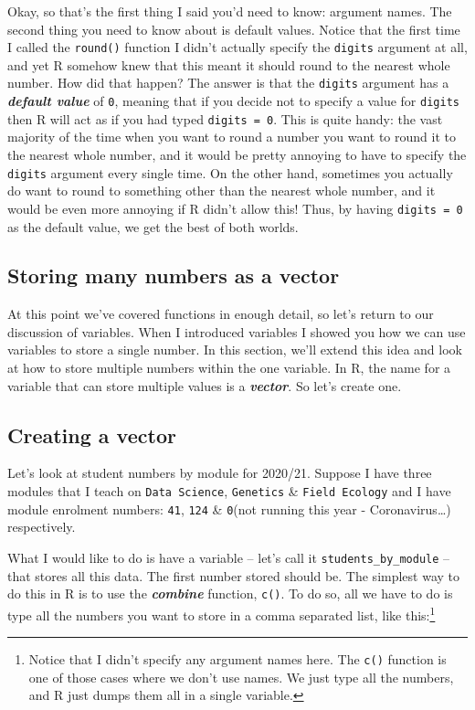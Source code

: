 \documentclass[
]{book}
\begin{document}
Okay, so that's the first thing I said you'd need to know: argument names. The second thing you need to know about is default values. Notice that the first time I called the \texttt{round()} function I didn't actually specify the \texttt{digits} argument at all, and yet R somehow knew that this meant it should round to the nearest whole number. How did that happen? The answer is that the \texttt{digits} argument has a \textbf{\emph{default value}} of \texttt{0}, meaning that if you decide not to specify a value for \texttt{digits} then R will act as if you had typed \texttt{digits\ =\ 0}. This is quite handy: the vast majority of the time when you want to round a number you want to round it to the nearest whole number, and it would be pretty annoying to have to specify the \texttt{digits} argument every single time. On the other hand, sometimes you actually do want to round to something other than the nearest whole number, and it would be even more annoying if R didn't allow this! Thus, by having \texttt{digits\ =\ 0} as the default value, we get the best of both worlds.

\hypertarget{vectors}{%
\subsection{Storing many numbers as a vector}\label{vectors}}

At this point we've covered functions in enough detail, so let's return to our discussion of variables. When I introduced variables I showed you how we can use variables to store a single number. In this section, we'll extend this idea and look at how to store multiple numbers within the one variable. In R, the name for a variable that can store multiple values is a \textbf{\emph{vector}}. So let's create one.

\hypertarget{creating-a-vector}{%
\subsection{Creating a vector}\label{creating-a-vector}}

Let's look at student numbers by module for 2020/21. Suppose I have three modules that I teach on \texttt{Data\ Science}, \texttt{Genetics} \& \texttt{Field\ Ecology} and I have module enrolment numbers: \texttt{41}, \texttt{124} \& \texttt{0}(not running this year - Coronavirus\ldots) respectively.

What I would like to do is have a variable -- let's call it \texttt{students\_by\_module} -- that stores all this data. The first number stored should be. The simplest way to do this in R is to use the \textbf{\emph{combine}} function, \texttt{c()}. To do so, all we have to do is type all the numbers you want to store in a comma separated list, like this:\footnote{Notice that I didn't specify any argument names here. The \texttt{c()} function is one of those cases where we don't use names. We just type all the numbers, and R just dumps them all in a single variable.}
\end{document}
